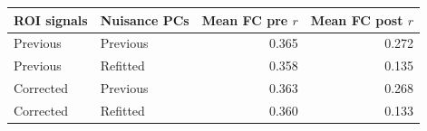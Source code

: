 \begin{tabular}{llrr}
\toprule
ROI signals & Nuisance PCs & Mean FC pre $r$ & Mean FC post $r$ \\
\midrule
Previous & Previous & 0.365 & 0.272 \\
Previous & Refitted & 0.358 & 0.135 \\
Corrected & Previous & 0.363 & 0.268 \\
Corrected & Refitted & 0.360 & 0.133 \\
\bottomrule
\end{tabular}
